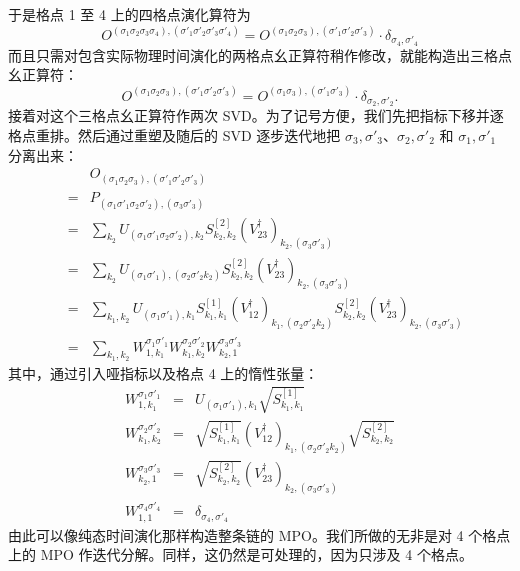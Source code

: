 \documentclass[a4paper,10pt,oneside,onecolumn,1p,times]{elsarticle}
\begin{document}
于是格点 1 至 4 上的四格点演化算符为
\begin{equation}
O^{(\sigma_1\sigma_2\sigma_3\sigma_4), (\sigma'_1\sigma'_2\sigma'_3\sigma'_4)} =
O^{(\sigma_1\sigma_2\sigma_3), (\sigma'_1\sigma'_2\sigma'_3)}\cdot \delta_{\sigma_4,\sigma'_4}
\end{equation}
而且只需对包含实际物理时间演化的两格点幺正算符稍作修改，就能构造出三格点幺正算符：
\begin{equation}
O^{(\sigma_1\sigma_2\sigma_3), (\sigma'_1\sigma'_2\sigma'_3)} = O^{(\sigma_1\sigma_3), (\sigma'_1\sigma'_3)} \cdot \delta_{\sigma_2,\sigma'_2} .
\end{equation}
接着对这个三格点幺正算符作两次 SVD。为了记号方便，我们先把指标下移并逐格点重排。然后通过重塑及随后的 SVD 逐步迭代地把 $\sigma_3,\sigma'_3$、$\sigma_2,\sigma'_2$ 和 $\sigma_1,\sigma'_1$ 分离出来： 
\begin{eqnarray*}
& & O_{(\sigma_1\sigma_2\sigma_3), (\sigma'_1\sigma'_2\sigma'_3)} \\
&=& P_{(\sigma_1 \sigma'_1\sigma_2\sigma'_2),(\sigma_3\sigma'_3)} \\
&=& \sum_{k_2} U_{(\sigma_1 \sigma'_1\sigma_2\sigma'_2),k_2} S^{[2]}_{k_2,k_2} (V^\dagger_{23})_{k_2,(\sigma_3\sigma'_3)} \\
&=&  \sum_{k_2} U_{(\sigma_1 \sigma'_1),(\sigma_2\sigma'_2 k_2)} S^{[2]}_{k_2,k_2} (V^\dagger_{23})_{k_2,(\sigma_3\sigma'_3)} \\
&=& \sum_{k_1,k_2} U_{(\sigma_1 \sigma'_1),k_1} S^{[1]}_{k_1,k_1} (V^\dagger_{12})_{k_1, (\sigma_2\sigma'_2 k_2)} S^{[2]}_{k_2,k_2} (V^\dagger_{23})_{k_2,(\sigma_3\sigma'_3)} \\
&=& \sum_{k_1,k_2} W^{\sigma_1 \sigma'_1}_{1,k_1} W^{\sigma_2 \sigma'_2}_{k_1,k_2} W^{\sigma_3 \sigma'_3}_{k_2,1} 
\end{eqnarray*}
其中，通过引入哑指标以及格点 4 上的惰性张量：
\begin{eqnarray}
W^{\sigma_1 \sigma'_1}_{1,k_1} &=& U_{(\sigma_1 \sigma'_1),k_1} \sqrt{S^{[1]}_{k_1,k_1}} \\
W^{\sigma_2 \sigma'_2}_{k_1,k_2} &=& \sqrt{S^{[1]}_{k_1,k_1}} (V^\dagger_{12})_{k_1, (\sigma_2\sigma'_2 k_2)} \sqrt{S^{[2]}_{k_2,k_2}} \\
W^{\sigma_3 \sigma'_3}_{k_2,1} &=& \sqrt{S^{[2]}_{k_2,k_2}} (V^\dagger_{23})_{k_2,(\sigma_3\sigma'_3)} \\
W^{\sigma_4 \sigma'_4}_{1,1} &=& \delta_{\sigma_4,\sigma'_4}
\end{eqnarray}
由此可以像纯态时间演化那样构造整条链的 MPO。我们所做的无非是对 4 个格点上的 MPO 作迭代分解。同样，这仍然是可处理的，因为只涉及 4 个格点。 
\end{document}

